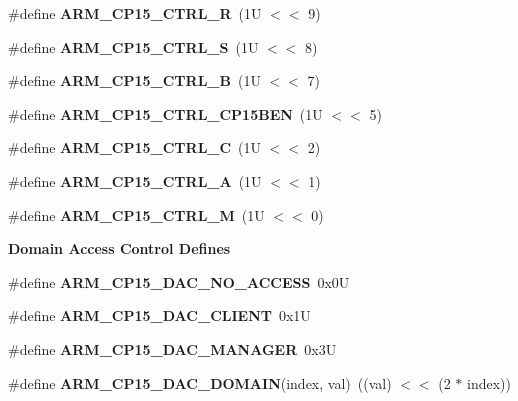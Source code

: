 \begin{Indent}
\begin{DoxyCompactItemize}
\item 
\#define {\bfseries A\+R\+M\+\_\+\+C\+P15\+\_\+\+C\+T\+R\+L\+\_\+R}~(1\+U $<$$<$ 9)
\item 
\#define {\bfseries A\+R\+M\+\_\+\+C\+P15\+\_\+\+C\+T\+R\+L\+\_\+S}~(1\+U $<$$<$ 8)
\item 
\#define {\bfseries A\+R\+M\+\_\+\+C\+P15\+\_\+\+C\+T\+R\+L\+\_\+B}~(1\+U $<$$<$ 7)
\item 
\#define {\bfseries A\+R\+M\+\_\+\+C\+P15\+\_\+\+C\+T\+R\+L\+\_\+\+C\+P15\+B\+EN}~(1\+U $<$$<$ 5)
\item 
\#define {\bfseries A\+R\+M\+\_\+\+C\+P15\+\_\+\+C\+T\+R\+L\+\_\+C}~(1\+U $<$$<$ 2)
\item 
\#define {\bfseries A\+R\+M\+\_\+\+C\+P15\+\_\+\+C\+T\+R\+L\+\_\+A}~(1\+U $<$$<$ 1)
\item 
\#define {\bfseries A\+R\+M\+\_\+\+C\+P15\+\_\+\+C\+T\+R\+L\+\_\+M}~(1\+U $<$$<$ 0)
\end{DoxyCompactItemize}
\end{Indent}
\begin{Indent}\textbf{ Domain Access Control Defines}\par
\begin{DoxyCompactItemize}
\item 
\#define {\bfseries A\+R\+M\+\_\+\+C\+P15\+\_\+\+D\+A\+C\+\_\+\+N\+O\+\_\+\+A\+C\+C\+E\+SS}~0x0U
\item 
\#define {\bfseries A\+R\+M\+\_\+\+C\+P15\+\_\+\+D\+A\+C\+\_\+\+C\+L\+I\+E\+NT}~0x1U
\item 
\#define {\bfseries A\+R\+M\+\_\+\+C\+P15\+\_\+\+D\+A\+C\+\_\+\+M\+A\+N\+A\+G\+ER}~0x3U
\item 
\#define {\bfseries A\+R\+M\+\_\+\+C\+P15\+\_\+\+D\+A\+C\+\_\+\+D\+O\+M\+A\+IN}(index,  val)~((val) $<$$<$ (2 $\ast$ index))
\end{DoxyCompactItemize}
\end{Indent}
